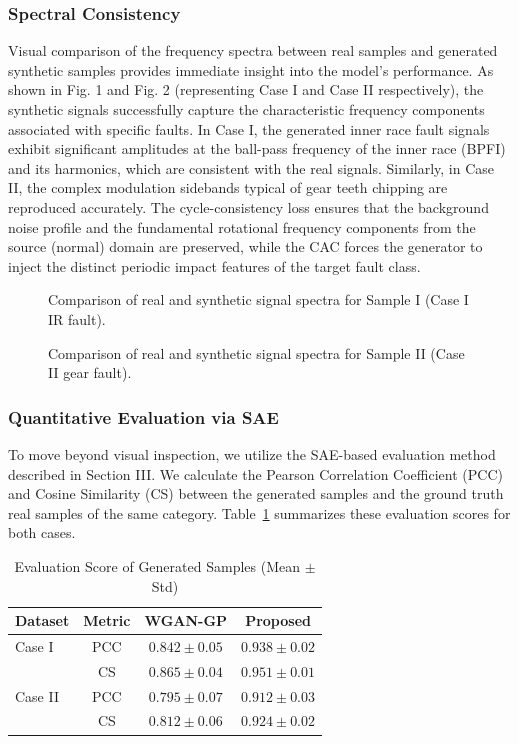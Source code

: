 \subsubsection{Spectral Consistency}
Visual comparison of the frequency spectra between real samples and generated synthetic samples provides immediate insight into the model's performance. As shown in Fig. 1 and Fig. 2 (representing Case I and Case II respectively), the synthetic signals successfully capture the characteristic frequency components associated with specific faults. In Case I, the generated inner race fault signals exhibit significant amplitudes at the ball-pass frequency of the inner race (BPFI) and its harmonics, which are consistent with the real signals. Similarly, in Case II, the complex modulation sidebands typical of gear teeth chipping are reproduced accurately. The cycle-consistency loss ensures that the background noise profile and the fundamental rotational frequency components from the source (normal) domain are preserved, while the CAC forces the generator to inject the distinct periodic impact features of the target fault class.

\begin{figure}[htbp]
\centering
\caption{Comparison of real and synthetic signal spectra for Sample I (Case I IR fault).}
\label{fig:gen_quality_1}
\end{figure}

\begin{figure}[htbp]
\centering
\caption{Comparison of real and synthetic signal spectra for Sample II (Case II gear fault).}
\label{fig:gen_quality_2}
\end{figure}

\subsubsection{Quantitative Evaluation via SAE}
To move beyond visual inspection, we utilize the SAE-based evaluation method described in Section III. We calculate the Pearson Correlation Coefficient (PCC) and Cosine Similarity (CS) between the generated samples and the ground truth real samples of the same category. Table~\ref{tab:gen_scores} summarizes these evaluation scores for both cases.

\begin{table}[htbp]
\centering
\caption{Evaluation Score of Generated Samples (Mean $\pm$ Std)}
\label{tab:gen_scores}
\begin{tabular}{lccc}
\hline
\textbf{Dataset} & \textbf{Metric} & \textbf{WGAN-GP} & \textbf{Proposed} \\ \hline
Case I & PCC & $0.842 \pm 0.05$ & $0.938 \pm 0.02$ \\
       & CS  & $0.865 \pm 0.04$ & $0.951 \pm 0.01$ \\ \hline
Case II & PCC & $0.795 \pm 0.07$ & $0.912 \pm 0.03$ \\
        & CS  & $0.812 \pm 0.06$ & $0.924 \pm 0.02$ \\
\hline
\end{tabular}
\end{table}

